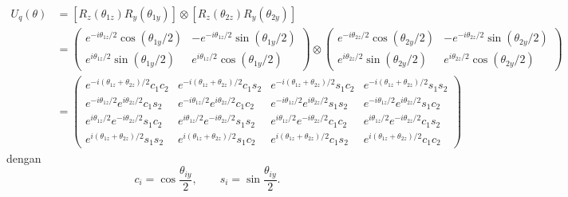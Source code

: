 \begin{equation}
\begin{align}
U_{q}(\theta) &= [R_z(\theta_{1z}) R_y(\theta_{1y})] \otimes [R_z(\theta_{2z}) R_y(\theta_{2y})]\\
&= \begin{pmatrix} e^{-i\theta_{1z}/2} \cos(\theta_{1y}/2) & -e^{-i\theta_{1z}/2} \sin(\theta_{1y}/2) \\ e^{i\theta_{1z}/2} \sin(\theta_{1y}/2) & e^{i\theta_{1z}/2} \cos(\theta_{1y}/2) \end{pmatrix} \otimes \begin{pmatrix} e^{-i\theta_{2z}/2} \cos(\theta_{2y}/2) & -e^{-i\theta_{2z}/2} \sin(\theta_{2y}/2) \\ e^{i\theta_{2z}/2} \sin(\theta_{2y}/2) & e^{i\theta_{2z}/2} \cos(\theta_{2y}/2) \end{pmatrix} \\
&= \begin{pmatrix} e^{-i(\theta_{1z}+\theta_{2z})/2} c_1c_2 & e^{-i(\theta_{1z}+\theta_{2z})/2} c_1s_2 & e^{-i(\theta_{1z}+\theta_{2z})/2} s_1c_2 & e^{-i(\theta_{1z}+\theta_{2z})/2}  s_1s_2  \\ e^{-i\theta_{1z}/2}e^{i\theta_{2z}/2} c_1s_2& e^{-i\theta_{1z}/2}e^{i\theta_{2z}/2}  c_1c_2& e^{-i\theta_{1z}/2}e^{i\theta_{2z}/2}  s_1s_2& e^{-i\theta_{1z}/2}e^{i\theta_{2z}/2}  s_1c_2  \\ e^{i\theta_{1z}/2}e^{-i\theta_{2z}/2} s_1c_2& e^{i\theta_{1z}/2}e^{-i\theta_{2z}/2} s_1s_2& e^{i\theta_{1z}/2}e^{-i\theta_{2z}/2} c_1c_2& e^{i\theta_{1z}/2}e^{-i\theta_{2z}/2}  c_1s_2  \\ e^{i(\theta_{1z}+\theta_{2z})/2}  s_1s_2& e^{i(\theta_{1z}+\theta_{2z})/2}  s_1c_2& e^{i(\theta_{1z}+\theta_{2z})/2}  c_1s_2& e^{i(\theta_{1z}+\theta_{2z})/2} c_1c_2 \end{pmatrix} \end{align}
\end{equation}
dengan
$$ c_i=\cos\frac{\theta_{iy}}2,\qquad s_i=\sin\frac{\theta_{iy}}2.  $$

